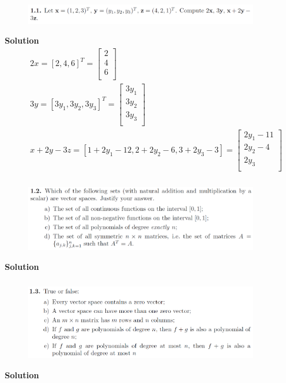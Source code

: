\documentclass[cs4size,a4paper]{ctexart}
\numberwithin{equation}{section}
\numberwithin{table}{section}
\numberwithin{figure}{section}
\begin{document}
 \subsubsection{}
\begin{figure}[H]
	\centering
	\includegraphics[width=0.9\textwidth]{1-1.png}
\end{figure}
\textbf{Solution}
\begin{align}
	&2x = \left[ 2,4,6 \right] ^T=\left[ \begin{array}{c}2\\4\\6\\\end{array} \right]  \\	
	&3y=\left[ 3y_1,3y_2,3y_3 \right] ^T=\left[ \begin{array}{c}		3y_1\\		3y_2\\		3y_3\\	\end{array} \right] \\
	&x+2y-3z = 
	\left[ 1+2y_1-12,2+2y_2-6,3+2y_3-3 \right] =\left[ \begin{array}{c}
		2y_1-11\\
		2y_2-4\\
		2y_3\\
	\end{array} \right] 
\end{align}

 \subsubsection{}
\begin{figure}[H]
	\centering
	\includegraphics[width=0.9\textwidth]{1-2.png}
\end{figure}
\textbf{Solution}

 \subsubsection{}
\begin{figure}[H]
	\centering
	\includegraphics[width=0.9\textwidth]{1-3.png}
\end{figure}
\textbf{Solution}
\end{document}
